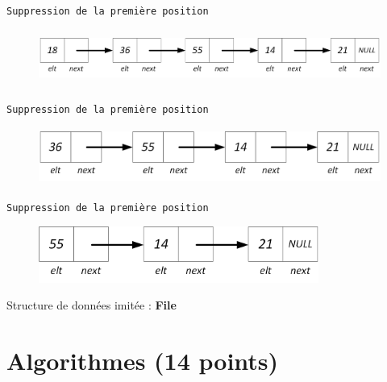 \documentclass[11pt,a4paper]{article}
\begin{document}
\begin{center}
\texttt{Suppression de la première position}

\begin{figure}[ht!]
\centering
\centerline{  %
\includegraphics[height=1.85cm]{img/f-4-Liste_p_5.png}
}
\end{figure}


\texttt{Suppression de la première position}

\begin{figure}[ht!]
\centering
\centerline{  %
\includegraphics[height=1.85cm]{img/f-5-Liste_p_4.png}
}
\end{figure}


\texttt{Suppression de la première position}

\begin{figure}[ht!]
\centering
\centerline{  %
\includegraphics[height=1.85cm]{img/f-6-Liste_p_3.png}
}
\end{figure}

\bigskip

\end{center}

Structure de données imitée : \textbf{File}

\bigskip



\newpage

%
\section{Algorithmes (14 points)}
\end{document}
